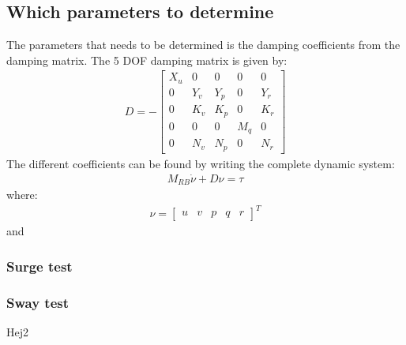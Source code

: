 \subsection{Which parameters to determine}
The parameters that needs to be determined is the damping coefficients from the damping matrix. The 5 \ac{DOF} damping matrix is given by:
\begin{align}
D = -
\begin{bmatrix}
X_u & 0 & 0 & 0 & 0\\
0 & Y_v & Y_p & 0 & Y_r\\
0 & K_v & K_p & 0 & K_r\\
0 & 0 & 0 & M_q & 0\\
0 & N_v & N_p & 0 & N_r
\end{bmatrix}
\end{align}
The different coefficients can be found by writing the complete dynamic system:
\begin{align}
M_{RB} \dot \nu + D\nu = \tau
\end{align}
where:
\begin{align}
\nu =
\begin{bmatrix}
u & v & p & q & r
\end{bmatrix}^T
\end{align}
and



\subsubsection{Surge test}

\subsubsection{Sway test}
Hej2

